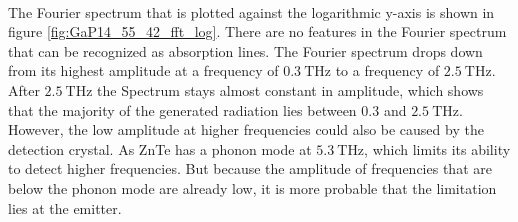 \\
The Fourier spectrum that is plotted against the logarithmic y-axis is shown in figure \ref{fig:GaP14_55_42_fft_log}.
There are no features in the Fourier spectrum that can be recognized as absorption lines.
The Fourier spectrum drops down from its highest amplitude at a frequency of $\SI{0.3}{\tera\hertz}$ to a frequency of $\SI{2.5}{\tera\hertz}$.
After $\SI{2.5}{\tera\hertz}$ the Spectrum stays almost constant in amplitude, which shows that the majority of the generated radiation lies between $0.3$ and $\SI{2.5}{\tera\hertz}$.
\\
However, the low amplitude at higher frequencies could also be caused by the detection crystal.
As ZnTe has a phonon mode at $\SI{5.3}{\tera\hertz}$, which limits its ability to detect higher frequencies.
But because the amplitude of frequencies that are below the phonon mode are already low, it is more probable that the limitation lies at the emitter.
